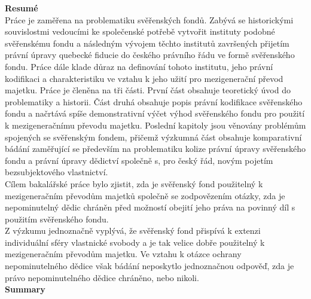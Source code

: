 \documentclass{article}
\begin{document}
\newpage
	\thispagestyle{empty}
	\begin{center}
		\textbf{\Large Resumé}\\
			\vspace*{5mm}
			Práce je zaměřena na problematiku svěřenských fondů. Zabývá se historickými souvislostmi vedoucími ke společenské potřebě vytvořit instituty podobné svěřenskému fondu a následným vývojem těchto institutů završených přijetím právní úpravy quebecké fiducie do českého právního řádu ve formě svěřenského fondu. Práce dále klade důraz na definování tohoto institutu, jeho právní kodifikaci a charakteristiku ve vztahu k jeho užití pro mezigenerační převod majetku. Práce je členěna na tři části. První část obsahuje teoretický úvod do problematiky a historii. Část druhá obsahuje popis právní kodifikace svěřenského fondu a načrtává spíše demonstrativní výčet výhod svěřenského fondu pro použití k mezigeneračnímu převodu majetku. Poslední kapitoly jsou věnovány problémům spojených se svěřenským fondem, přičemž výzkumná část obsahuje komparativní bádání zaměřující se především na problematiku kolize právní úpravy svěřenského fondu a právní úpravy dědictví společně s, pro český řád, novým pojetím bezsubjektového vlastnictví.\\
			\vspace*{5mm}
			Cílem bakalářské práce bylo zjistit, zda je svěřenský fond použitelný k mezigeneračním převodům majetků společně se zodpovězením otázky, zda je nepominutelný dědic chráněn před možností obejití jeho práva na povinný díl s použitím svěřenského fondu.\\
			\vspace*{5mm}
			Z výzkumu jednoznačně vyplývá, že svěřenský fond přispívá k extenzi individuální sféry vlastnické svobody a je tak velice dobře použitelný k mezigeneračním převodům majetku. Ve vztahu k otázce ochrany nepominutelného dědice však bádání neposkytlo jednoznačnou odpověď, zda je právo nepominutelného dědice chráněno, nebo nikoli.\\
		\vspace*{10mm}
		\textbf{\Large Summary}\\
			\vspace*{5mm}

\end{center}
\end{document}
